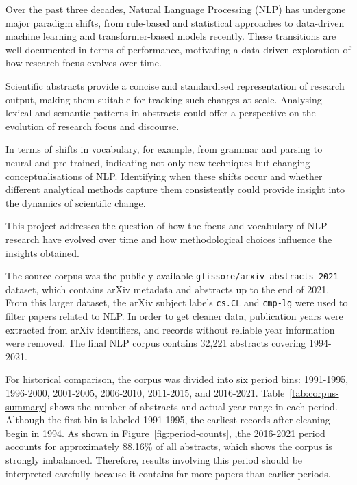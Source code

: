 Over the past three decades, Natural Language Processing (NLP) has undergone major paradigm shifts, from rule-based and statistical approaches to data-driven machine learning and transformer-based models recently. These transitions are well documented in terms of performance, motivating a data-driven exploration of how research focus evolves over time.

Scientific abstracts provide a concise and standardised representation of research output, making them suitable for tracking such changes at scale. Analysing lexical and semantic patterns in abstracts could offer a perspective on the evolution of research focus and discourse.

In terms of shifts in vocabulary, for example, from grammar and parsing to neural and pre-trained, indicating not only new techniques but changing conceptualisations of NLP. Identifying when these shifts occur and whether different analytical methods capture them consistently could provide insight into the dynamics of scientific change.

This project addresses the question of how the focus and vocabulary of NLP research have evolved over time and how methodological choices influence the insights obtained.


The source corpus was the publicly available \texttt{gfissore/arxiv-abstracts-2021} dataset, which contains arXiv metadata and abstracts up to the end of 2021. From this larger dataset, the arXiv subject labels \texttt{cs.CL} and \texttt{cmp-lg} were used to filter papers related to NLP. In order to get cleaner data, publication years were extracted from arXiv identifiers, and records without reliable year information were removed. The final NLP corpus contains 32,221 abstracts covering 1994-2021.

For historical comparison, the corpus was divided into six period bins: 1991-1995, 1996-2000, 2001-2005, 2006-2010, 2011-2015, and 2016-2021. Table~\ref{tab:corpus-summary} shows the number of abstracts and actual year range in each period. Although the first bin is labeled 1991-1995, the earliest records after cleaning begin in 1994. As shown in Figure~\ref{fig:period-counts}, ,the 2016-2021 period accounts for approximately 88.16\% of all abstracts, which shows the corpus is strongly imbalanced. Therefore, results involving this period should be interpreted carefully because it contains far more papers than earlier periods.

